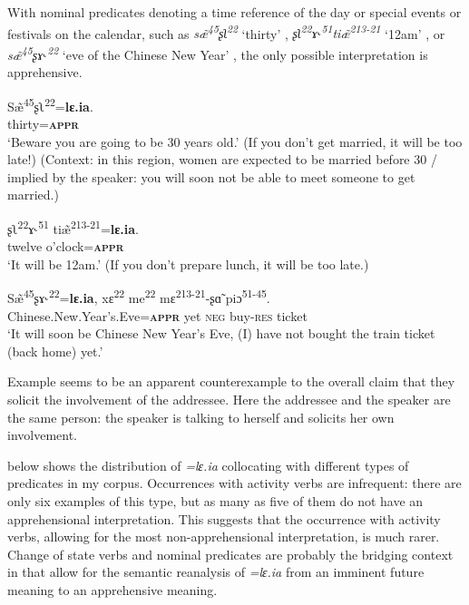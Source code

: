 \documentclass[output=paper,colorlinks,citecolor=brown, language=chinese]{langscibook}
\begin{document}
With nominal predicates denoting a time reference of the day or special events or festivals on the calendar, such as \textit{s\~æ\textsuperscript{45}ʂʅ\textsuperscript{22}} `thirty' , \textit{ʂʅ\textsuperscript{22}ɤ˞\textsuperscript{51}ti\~æ\textsuperscript{213-21}} `12am' , or \textit{s\~æ\textsuperscript{45}ʂɤ˞\textsuperscript{22}} `eve of the Chinese New Year' ,  the only possible interpretation is apprehensive. 

\ea\label{ex:Song20}
\gll S\~æ\textsuperscript{45}ʂʅ\textsuperscript{22}=\textbf{lɛ.ia}. \\
thirty=\textbf{\textsc{appr}}\\
\glt `Beware you are going to be 30 years old.' (If you don't get married, it will be too late!) (Context: in this region, women are expected to be married before 30 / implied by the speaker: you will soon not be able to meet someone to get married.)
\z

\ea\label{ex:Song21}
\gll ʂʅ\textsuperscript{22}ɤ˞\textsuperscript{51} ti\~æ\textsuperscript{213-21}=\textbf{lɛ.ia}. \\
twelve o'clock=\textsc{\textbf{appr}}\\
\glt `It will be 12am.' (If you don't prepare lunch, it will be too late.)
\z


\ea\label{ex:Song22}
\gll S\~æ\textsuperscript{45}ʂɤ˞\textsuperscript{22}=\textbf{lɛ.ia}, xɛ\textsuperscript{22} me\textsuperscript{22} mɛ\textsuperscript{213-21}-ʂɑ̃ piɔ\textsuperscript{51-45}. \\
Chinese.New.Year's.Eve=\textsc{\textbf{appr}} yet \textsc{neg} buy-\textsc{res} ticket \\
\glt `It will soon be Chinese New Year's Eve, (I) have not bought the train ticket (back home) yet.'
\z


\noindent Example  seems to be an apparent counterexample to the overall claim that they solicit the involvement of the addressee. Here the addressee and the speaker are the same person: the speaker is talking to herself and solicits her own involvement.

 below shows the distribution of \textit{=lɛ.ia} collocating with different types of predicates in my corpus. Occurrences with activity verbs are infrequent: there are only six examples of this type, but as many as five of them do not have an apprehensional interpretation. This suggests that the occurrence with activity verbs, allowing for the most non-apprehensional interpretation, is much rarer. Change of state verbs and nominal predicates are probably the bridging context in  that allow for the semantic reanalysis of \textit{=lɛ.ia} from an imminent future meaning to an apprehensive meaning.
 
\end{document}
